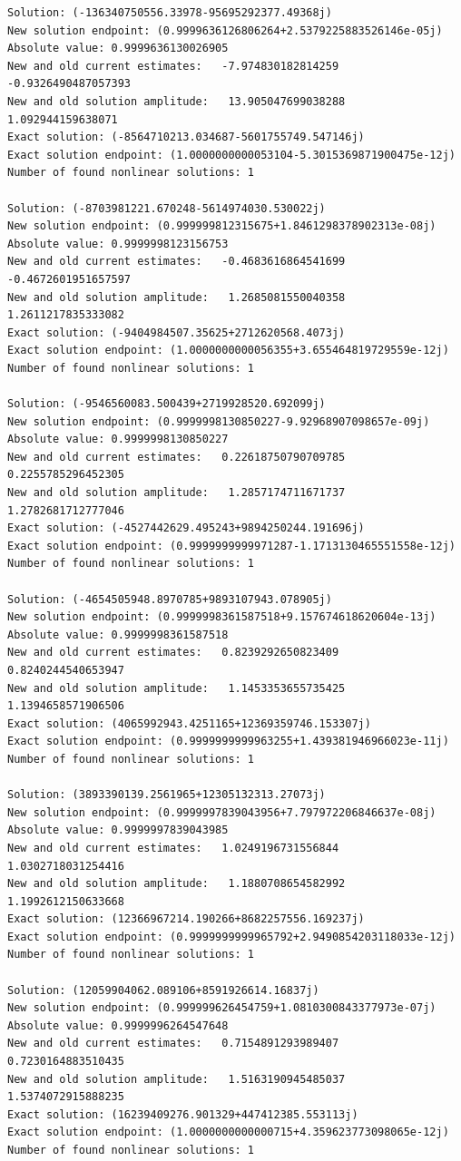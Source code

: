 \documentclass{article}
\begin{document}
\begin{verbatim}
Solution: (-136340750556.33978-95695292377.49368j)
New solution endpoint: (0.9999636126806264+2.5379225883526146e-05j) Absolute value: 0.9999636130026905
New and old current estimates:   -7.974830182814259    -0.9326490487057393
New and old solution amplitude:   13.905047699038288    1.092944159638071
Exact solution: (-8564710213.034687-5601755749.547146j)
Exact solution endpoint: (1.0000000000053104-5.3015369871900475e-12j)
Number of found nonlinear solutions: 1

Solution: (-8703981221.670248-5614974030.530022j)
New solution endpoint: (0.999999812315675+1.8461298378902313e-08j) Absolute value: 0.9999998123156753
New and old current estimates:   -0.4683616864541699    -0.4672601951657597
New and old solution amplitude:   1.2685081550040358    1.2611217835333082
Exact solution: (-9404984507.35625+2712620568.4073j)
Exact solution endpoint: (1.0000000000056355+3.655464819729559e-12j)
Number of found nonlinear solutions: 1

Solution: (-9546560083.500439+2719928520.692099j)
New solution endpoint: (0.9999998130850227-9.92968907098657e-09j) Absolute value: 0.9999998130850227
New and old current estimates:   0.22618750790709785    0.2255785296452305
New and old solution amplitude:   1.2857174711671737    1.2782681712777046
Exact solution: (-4527442629.495243+9894250244.191696j)
Exact solution endpoint: (0.9999999999971287-1.1713130465551558e-12j)
Number of found nonlinear solutions: 1

Solution: (-4654505948.8970785+9893107943.078905j)
New solution endpoint: (0.9999998361587518+9.157674618620604e-13j) Absolute value: 0.9999998361587518
New and old current estimates:   0.8239292650823409    0.8240244540653947
New and old solution amplitude:   1.1453353655735425    1.1394658571906506
Exact solution: (4065992943.4251165+12369359746.153307j)
Exact solution endpoint: (0.9999999999963255+1.439381946966023e-11j)
Number of found nonlinear solutions: 1

Solution: (3893390139.2561965+12305132313.27073j)
New solution endpoint: (0.9999997839043956+7.797972206846637e-08j) Absolute value: 0.9999997839043985
New and old current estimates:   1.0249196731556844    1.0302718031254416
New and old solution amplitude:   1.1880708654582992    1.1992612150633668
Exact solution: (12366967214.190266+8682257556.169237j)
Exact solution endpoint: (0.9999999999965792+2.9490854203118033e-12j)
Number of found nonlinear solutions: 1

Solution: (12059904062.089106+8591926614.16837j)
New solution endpoint: (0.999999626454759+1.0810300843377973e-07j) Absolute value: 0.9999996264547648
New and old current estimates:   0.7154891293989407    0.7230164883510435
New and old solution amplitude:   1.5163190945485037    1.5374072915888235
Exact solution: (16239409276.901329+447412385.553113j)
Exact solution endpoint: (1.0000000000000715+4.359623773098065e-12j)
Number of found nonlinear solutions: 1


\end{verbatim}
\end{document}
